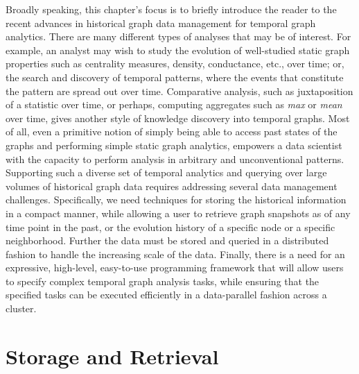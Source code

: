 \documentclass{svjour3}
\begin{document}




Broadly speaking, this chapter's focus is to briefly introduce the reader to the recent advances in historical graph data management for temporal graph analytics. 
There are many different types of analyses that may be of interest. 
For example, an analyst may wish to study the evolution of well-studied static graph properties such
as centrality measures, density, conductance, etc., over time; or, the search and 
discovery of temporal patterns, where the events that constitute the pattern are spread out over time. 
Comparative analysis, such as juxtaposition of a statistic over time, or perhaps, computing 
aggregates such as \textit{max} or \textit{mean} over time, gives another style of knowledge discovery 
into temporal graphs. Most of all, even a primitive notion of simply being able to access past states of the graphs 
and performing simple static graph analytics, empowers a data scientist with the capacity to 
perform analysis in arbitrary and unconventional patterns. 
Supporting such a diverse set of temporal analytics and querying over large volumes of historical graph data 
requires addressing several data management challenges. Specifically, we need techniques for storing
the historical information in a compact manner, while allowing a user to retrieve graph snapshots as of any
time point in the past, or the evolution history of a specific node or a specific neighborhood. Further the
data must be stored and queried in a distributed fashion to handle the increasing scale of the data. 
Finally, there is a need for an expressive, high-level, easy-to-use programming framework that will allow users to 
specify complex temporal graph analysis tasks, while ensuring that the specified tasks can be executed efficiently 
in a data-parallel fashion across a cluster.



\section{Storage and Retrieval}
\end{document}
